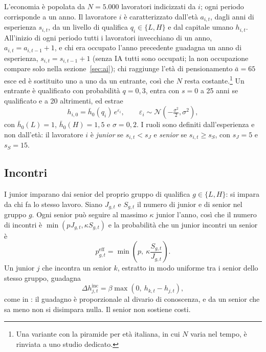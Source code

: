 \documentclass[preprint,12pt,authoryear]{elsarticle}
\begin{document}
L'economia è popolata da $N=5.000$ lavoratori indicizzati da $i$; ogni periodo corrisponde a un anno. Il lavoratore $i$ è caratterizzato dall'età $a_{i,t}$, dagli anni di esperienza $s_{i,t}$, da un livello di qualifica $q_i\in\{L,H\}$ e dal capitale umano $h_{i,t}$. All'inizio di ogni periodo tutti i lavoratori invecchiano di un anno, $a_{i,t}=a_{i,t-1}+1$, e chi era occupato l'anno precedente guadagna un anno di esperienza, $s_{i,t}=s_{i,t-1}+1$ (senza IA tutti sono occupati; la non occupazione compare solo nella sezione~\ref{sec:ai}); chi raggiunge l'età di pensionamento $\bar a=65$ esce ed è sostituito uno a uno da un entrante, così che $N$ resta costante.\footnote{Una variante con la piramide per età italiana, in cui $N$ varia nel tempo, è rinviata a uno studio dedicato.} Un entrante è qualificato con probabilità $q=0{,}3$, entra con $s=0$ a 25 anni se qualificato e a 20 altrimenti, ed estrae
\begin{equation}\label{eq:entry}
h_{i,0} = \bar h_0(q_i)\, e^{\varepsilon_i}, \qquad \varepsilon_i \sim \mathcal N\!\left(-\tfrac{\sigma^2}{2},\sigma^2\right),
\end{equation}
con $\bar h_0(L)=1$, $\bar h_0(H)=1{,}5$ e $\sigma=0{,}2$. I ruoli sono definiti dall'esperienza e non dall'età: il lavoratore $i$ è \emph{junior} se $s_{i,t} < s_J$ e \emph{senior} se $s_{i,t} \ge s_S$, con $s_J=5$ e $s_S=15$.

\subsection{Incontri}

I junior imparano dai senior del proprio gruppo di qualifica $g\in\{L,H\}$: si impara da chi fa lo stesso lavoro. Siano $J_{g,t}$ e $S_{g,t}$ il numero di junior e di senior nel gruppo $g$. Ogni senior può seguire al massimo $\kappa$ junior l'anno, così che il numero di incontri è $\min(pJ_{g,t},\kappa S_{g,t})$ e la probabilità che un junior incontri un senior è
\begin{equation}\label{eq:peff}
p^{\mathrm{eff}}_{g,t} = \min\!\left(p,\ \kappa \frac{S_{g,t}}{J_{g,t}}\right).
\end{equation}
Un junior $j$ che incontra un senior $k$, estratto in modo uniforme tra i senior dello stesso gruppo, guadagna
\begin{equation}\label{eq:meeting}
\Delta h^{\mathrm{inc}}_{j,t} = \beta \max\left(0,\ h_{k,t}-h_{j,t}\right),
\end{equation}
come in \citet{LucasMoll2014}: il guadagno è proporzionale al divario di conoscenza, e da un senior che sa meno non si disimpara nulla. Il senior non sostiene costi.
\end{document}
